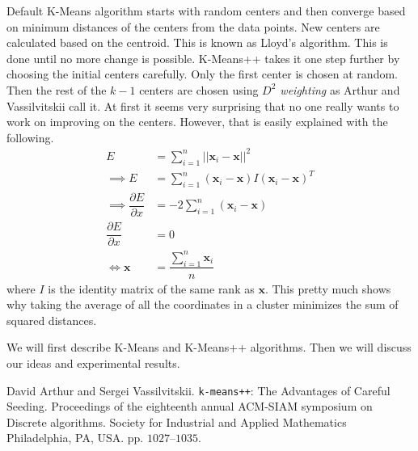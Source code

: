 \documentclass[10pt, leqno]{article}
\newcommand{\x}{\mathbf{x}}
\begin{document}
	Default K-Means algorithm starts with random centers and then converge based on minimum distances of the centers from the data points. New centers are calculated based on the centroid. This is known as Lloyd's algorithm. This is done until no more change is possible. K-Means++ takes it one step further by choosing the initial centers carefully. Only the first center is chosen at random. Then the rest of the $k-1$ centers are chosen using \textit{$D^2$ weighting} as Arthur and Vassilvitskii call it\cite{kmeans++}. At first it seems very surprising that no one really wants to work on improving on the centers. However, that is easily explained with the following.
		\begin{align*}
			E & = \sum_{i=1}^n||\x_i-\x||^2\\
			\implies E & = \sum_{i=1}^n(\x_i-\x)I(\x_i-\x)^{T}\\
			\implies \dfrac{\partial{E}}{\partial{x}} & = -2\sum_{i=1}^n(\x_i-\x)\\
			\dfrac{\partial{E}}{\partial{x}} & = 0\\
			\iff \x & = \dfrac{\sum_{i=1}^n\x_i}{n}
		\end{align*}
	where $I$ is the identity matrix of the same rank as $\x$. This pretty much shows why taking the average of all the coordinates in a cluster minimizes the sum of squared distances.
	
	We will first describe K-Means and K-Means++ algorithms. Then we will discuss our ideas and experimental results.
	\begin{thebibliography}{99}
		 David Arthur and Sergei Vassilvitskii. \texttt{k-means++}: The Advantages of Careful Seeding. Proceedings of the eighteenth annual ACM-SIAM symposium on Discrete algorithms. Society for Industrial and Applied Mathematics Philadelphia, PA, USA. pp. $1027–1035$.
	\end{thebibliography}
\end{document}
